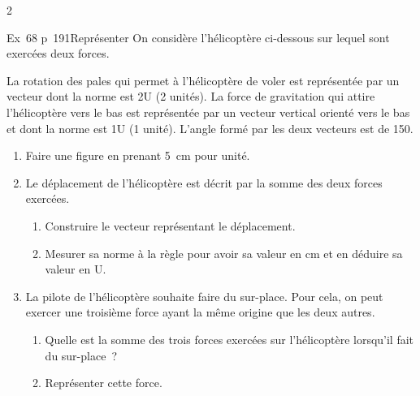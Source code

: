 \documentclass[11pt,a4paper]{article}
\newcommand{\starfull}[1]{{\color{#1}\ding{72}}}
\newcommand{\starempty}{{\color{gray!45}\ding{73}}}
\begin{document}
\begin{multicols}{2}
\begin{Exo}{Ex~68 p~191}{\starfull{diffgreen}\starempty\starempty}{Représenter}
On considère l'hélicoptère ci-dessous sur lequel sont exercées deux forces.
\begin{center}
\end{center}
La rotation des pales qui permet à l'hélicoptère de voler est représentée par un vecteur dont la norme est 2U (2 unités). La force de gravitation qui attire l'hélicoptère vers le bas est représentée par un vecteur vertical orienté vers le bas et dont la norme est 1U (1 unité). L'angle formé par les deux vecteurs est de 150\textdegree.
\begin{enumerate}
\item Faire une figure en prenant 5~cm pour unité.
\item Le déplacement de l'hélicoptère est décrit par la somme des deux forces exercées.
\begin{enumerate}
\item[a.] Construire le vecteur représentant le déplacement.
\item[b.] Mesurer sa norme à la règle pour avoir sa valeur en cm et en déduire sa valeur en U.
\end{enumerate}
\item La pilote de l'hélicoptère souhaite faire du sur-place. Pour cela, on peut exercer une troisième force ayant la même origine que les deux autres.
\begin{enumerate}
\item[a.] Quelle est la somme des trois forces exercées sur l'hélicoptère lorsqu'il fait du sur-place~?
\item[b.] Représenter cette force.
\end{enumerate}
\end{enumerate}
\end{Exo}


\end{multicols}
\end{document}
